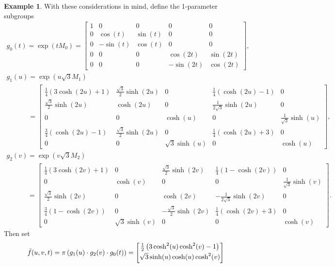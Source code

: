 \documentclass[10pt,a4paper]{amsart}
\numberwithin{equation}{section}
\theoremstyle{definition}
\newtheorem{exmpl}[teo]{Example}
\begin{document}
\begin{exmpl}
With these considerations in mind, def\/ine the 1-parameter subgroups
\begin{gather*}
g_0(t)= \exp(tM_0) =
\begin{bmatrix}
1 & 0 & 0 & 0 & 0
\\
0 & \cos(t) & \sin(t) & 0 & 0
\\
0 & -\sin(t) & \cos(t) & 0 & 0
\\
0 & 0 & 0 & \cos(2t) & \sin(2t)
\\
0 & 0 & 0 & -\sin(2t) & \cos(2t)
\end{bmatrix},
\\
g_1(u)= \exp(u \sqrt{3} M_1)
\\
\phantom{g_1(u)}
=
\begin{bmatrix}
\tfrac{1}{4}(3 \cosh(2u) + 1) & \tfrac{\sqrt{3}}{2}\sinh(2u) & 0 & \tfrac{1}{4} (\cosh(2u) - 1) & 0
\\
\tfrac{\sqrt{3}}{2}\sinh(2u) & \cosh(2u) & 0 & \tfrac{1}{2\sqrt{3}} \sinh(2u) & 0
\\
0 & 0 & \cosh(u) & 0 & \tfrac{1}{\sqrt{3}} \sinh(u)
\\
\tfrac{3}{4}(\cosh(2u)-1) & \tfrac{\sqrt{3}}{2}\sinh(2u) & 0 & \tfrac{1}{4}(\cosh(2u) + 3) & 0
\\
0 & 0 & \sqrt{3} \sinh(u) & 0 & \cosh(u)
\end{bmatrix},
\\
g_2(v)= \exp(v \sqrt{3} M_2)
\\
\phantom{g_2(v)}
=
\begin{bmatrix}
\tfrac{1}{4}(3 \cosh(2v) + 1) & 0 & \tfrac{\sqrt{3}}{2}\sinh(2v) & \tfrac{1}{4} (1 - \cosh(2v)) & 0
\\
0 & \cosh(v) & 0 & 0 & \tfrac{1}{\sqrt{3}}\sinh(v)
\\
\tfrac{\sqrt{3}}{2}\sinh(2v) & 0 & \cosh(2v) & -\tfrac{1}{2\sqrt{3}} \sinh(2v) & 0
\\
\tfrac{3}{4}(1 - \cosh(2v)) & 0 & -\tfrac{\sqrt{3}}{2}\sinh(2v) & \tfrac{1}{4}(\cosh(2v) + 3) & 0
\\
0 & \sqrt{3} \sinh(v) & 0 & 0 & \cosh(v)
\end{bmatrix}.
\end{gather*}
Then set
\begin{gather}
\bar{f}(u,v,t) = \pi\left(g_1(u) \cdot g_2(v) \cdot g_0(t) \right) =
\begin{bmatrix}
\tfrac{1}{2}\left(3\cosh^2(u)\cosh^2(v) - 1 \right)
\vspace{1mm}\\
\sqrt{3} \sinh(u) \cosh(u) \cosh^2(v)
\vspace{1mm}\\

\end{bmatrix}
\end{gather}
\end{exmpl}
\end{document}
